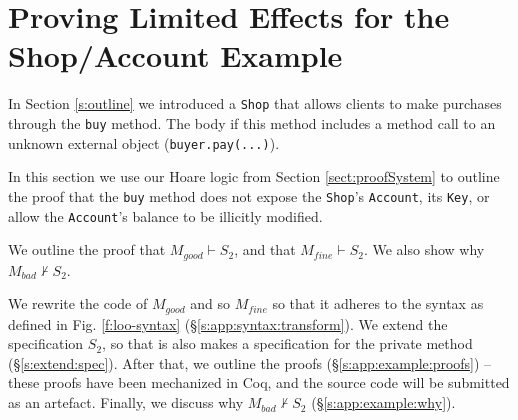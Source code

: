 \newcommand{\STwo}{\ensuremath{S_2}}
\newcommand{\STwoStrong}{\ensuremath{S_{2,strong}}}
\newcommand{\SPT}{~ \strut \hspace{.9cm}}
\newcommand{\Alocals}{\prg{A}_{buy}}
\newcommand{\Alocalsb}{\prg{A}_{1}}
\newcommand{\Ids}{\prg{Ids}_{buy}}
\newcommand{\Alocalstr}{\prg{A}_{trns}}
\newcommand{\Idstr}{\prg{Ids}_{trns}}
\newcommand{\Alocalsset}{\prg{A}_{set}}
\newcommand{\Alocalssets}{\prg{A}_{2}}
\newcommand{\Idsset}{\prg{Ids}_{set}}
\newcommand{\stmtsP}{\prg{stmts}_{10,11,12}}
\newcommand{\step}[1]{ \vspace{.1cm} \noindent {\textbf{#1}}}

\section{  {Proving Limited Effects for the Shop/Account Example}}

\label{s:app:example}

In Section \ref{s:outline} we introduced a \verb|Shop| that allows clients to make purchases through the
\verb|buy| method.
The body if this method  includes a method call to an unknown external object (\verb|buyer.pay(...)|).

In this section  we use our Hoare logic from Section \ref{sect:proofSystem} to {outline the proof} that the \verb|buy| method
does not expose the \verb|Shop|'s  \verb|Account|, its \verb|Key|, or allow the \verb|Account|'s balance to be illicitly modified. 

We {outline the proof} that $M_{good} \vdash \STwo$, and that $M_{fine} \vdash \STwo$.
{We  also show why $M_{bad} \not\vdash \STwo$.}

{We   rewrite the code of $M_{good}$ and so $M_{fine}$
so that it adheres to the syntax as defined in Fig. \ref{f:loo-syntax} (\S \ref{s:app:syntax:transform}). 
We  extend the specification $\STwo$, so that is also makes a specification for the private method  (\S \ref{s:extend:spec}). 
After that, we outline the proofs (\S \ref{s:app:example:proofs}) --
these proofs have been mechanized in Coq, and the source code will be
submitted as an artefact. %
Finally, we discuss why $M_{bad} \not\vdash \STwo$ (\S \ref{s:app:example:why}).}






